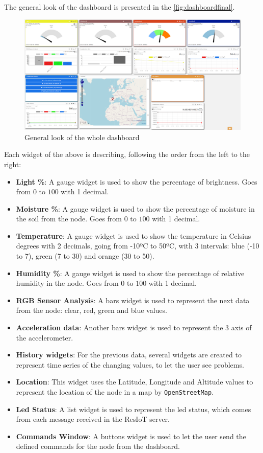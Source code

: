 The general look of the dashboard is presented in the \autoref{fig:dashboardfinal}.
\begin{figure}[H]
    \centering
    \includegraphics[width=1\textwidth]{images/6/Dashboard.png}
    \caption{General look of the whole dashboard}
    \label{fig:dashboardfinal}
\end{figure}
Each widget of the above is describing, following the order from the left to the right:
\begin{itemize}
    \item \textbf{Light \%}: A gauge widget is used to show the percentage of brightness. Goes from $0$ to $100$ with 1 decimal.
    \item \textbf{Moisture \%}: A gauge widget is used to show the percentage of moisture in the soil from the node. Goes from $0$ to $100$ with 1 decimal.
    \item \textbf{Temperature}: A gauge widget is used to show the temperature in Celsius degrees with 2 decimals, going from -10ºC to 50ºC, with 3 intervals: blue (-10 to 7), green (7 to 30) and orange (30 to 50).
    \item \textbf{Humidity \%}: A gauge widget is used to show the percentage of relative humidity in the node. Goes from $0$ to $100$ with 1 decimal.
    \item \textbf{RGB Sensor Analysis}: A bars widget is used to represent the next data from the node: clear, red, green and blue values.
    \item \textbf{Acceleration data}: Another bars widget is used to represent the 3 axis of the accelerometer.
    \item \textbf{History widgets}: For the previous data, several widgets are created to represent time series of the changing values, to let the user see problems.
    \item \textbf{Location}: This widget uses the Latitude, Longitude and Altitude values to represent the location of the node in a map by \texttt{OpenStreetMap}.
    \item \textbf{Led Status}: A list widget is used to represent the led status, which comes from each message received in the ResIoT server.
    \item \textbf{Commands Window}: A buttons widget is used to let the user send the defined commands for the node from the dashboard.
\end{itemize}
\clearpage